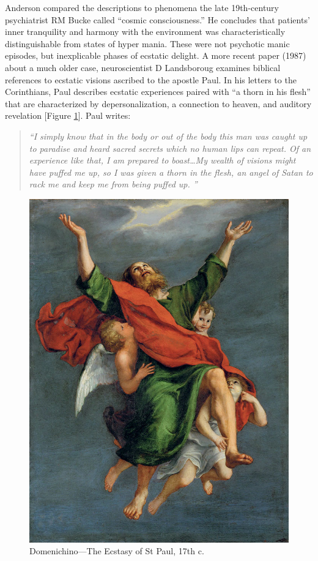 \documentclass{UIdahoMastersThesis}
\begin{document}
Anderson compared the descriptions to phenomena the late 19th-century psychiatrist RM Bucke called ``cosmic consciousness.'' He concludes that patients' inner tranquility and harmony with the environment was characteristically distinguishable from states of hyper mania. These were not psychotic manic episodes, but inexplicable phases of ecstatic delight.
A more recent paper (1987) about a much older case, neuroscientist D Landsboroug examines biblical references to ecstatic visions ascribed to the apostle Paul. In his letters to the Corinthians, Paul describes ecstatic experiences paired with ``a thorn in his flesh'' that are characterized by depersonalization, a connection to heaven, and auditory revelation [Figure \ref{fig:paul}]. Paul writes:

\begin{quote}
\textit{``I simply know that in the body or out of the body this man was caught up to paradise and heard sacred secrets which no human lips can repeat. Of an experience like that, I am prepared to boast\ldots My wealth of visions might have puffed me up, so I was given a thorn in the flesh, an angel of Satan to rack me and keep me from being puffed up. ''}\cite{bible_new_1984}
\end{quote}

\begin{figure}[h!]
	\centering
	\includegraphics[width=0.63\linewidth]{paul.jpg}
	\caption{Domenichino---The Ecstasy of St Paul, 17th c.}
	\label{fig:paul}
\end{figure}
\end{document}
